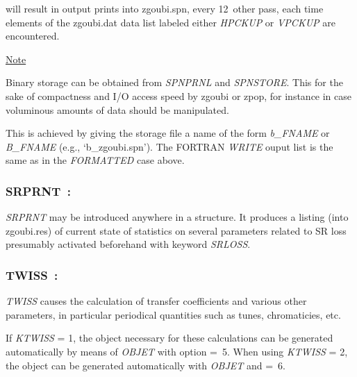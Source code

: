 \noindent will result in output prints into zgoubi.spn, every 12~other 
pass, each time elements of the zgoubi.dat  data list labeled either \textsl{HPCKUP}
or \textsl{VPCKUP} are encountered.

\bigskip

\noindent\underline{Note}

\noindent Binary storage can be obtained from \textsl{SPNPRNL} and \textsl{SPNSTORE}. This for 
the sake of compactness and I/O access speed by zgoubi  or zpop, for instance  in case  voluminous amounts of 
data should be manipulated. 

This is achieved by giving the storage file a name of the form \textsl{b\_FNAME} 
or \textsl{B\_FNAME}  (e.g., `b\_zgoubi.spn'). The FORTRAN \textsl{WRITE} ouput list 
is the same as in the \textsl{FORMATTED} case above.  





\newpage

\subsubsection*{SRPRNT~: \SRPRNTTitl}\label{SRPRNT}

\noindent\textsl{SRPRNT} may be introduced anywhere in a structure. It produces
a listing (into zgoubi.res) of current state of statistics on several parameters related to 
SR loss  presumably  activated beforehand with keyword \textsl{SRLOSS}. 

 \newpage


\subsubsection*{TWISS~: \TWISSTitl}\label{TWISS} 
\medskip

\textsl{TWISS}  
causes the calculation of 
  transfer coefficients and various other parameters, in particular 
periodical quantities  such as tunes, chromaticies, etc. 

\noindent If \textsl{KTWISS} = 1, the object necessary for these calculations 
    can be generated automatically by means of \textsl{OBJET}  with
option \mbox{\KOBJ= 5}.   
When using 
\textsl{KTWISS} = 2, the object can be generated automatically with \textsl{OBJET}  and 
 \mbox{\KOBJ=  6}. 

 
\newpage




